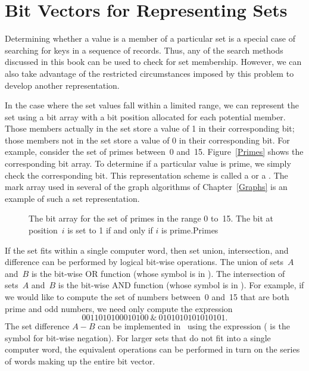 \section{Bit Vectors for Representing Sets}
\label{SetSearch}

Determining whether a value is a member of a particular set is a
special case of searching for keys in a sequence of
records.
Thus, any of the search methods discussed in this book can be
used to check for set membership.
However, we can also take advantage of the restricted circumstances
imposed by this problem to develop another representation.

In the case where the set values fall within a limited range, we
can represent the set using a bit array with a bit position allocated
for each potential member.
Those members actually in the set store a value of 1 in their
corresponding bit;
those members not in the set store a value of 0 in their corresponding
bit.
For example, consider the set of primes between~0 and~15.
Figure~\ref{Primes} shows the corresponding bit array.
To determine if a particular value is prime, we simply check
the corresponding bit.
This representation scheme is called a  or a
.
The mark array used in several of the graph algorithms of
Chapter~\ref{Graphs} is an example of such a set representation.

\begin{figure}
\vspace{-\bigskipamount}\vspace{-\medskipamount}\vspace{-\smallskipamount}

{The bit array for the set of primes in the range 0 to~15.
The bit at position~\(i\) is set to 1 if and only if \(i\) is
prime.}{Primes}
\smallskip
\end{figure}

If the set fits within a single computer word, then
set union, intersection,
and difference can be performed by logical bit-wise operations.
The union of sets~\(A\) and~\(B\) is the bit-wise OR function (whose
symbol is \Cref{|} in \Lang).
The intersection of sets~\(A\) and~\(B\) is the bit-wise AND function
(whose symbol is \Cref{\&} in \Lang).
For example, if we would like to compute the set of numbers between~0
and~15 that are both prime and odd numbers, we need only compute the
expression
\[ 0011010100010100\ \&\ 0101010101010101. \]
\noindent The set difference \(A - B\) can be implemented in \Lang\ using
the expression  (\Cref{\~{ }}
is the symbol for bit-wise negation).
For larger sets that do not fit into a single computer word, the
equivalent operations can be performed in turn on the series of words
making up the entire bit vector.

